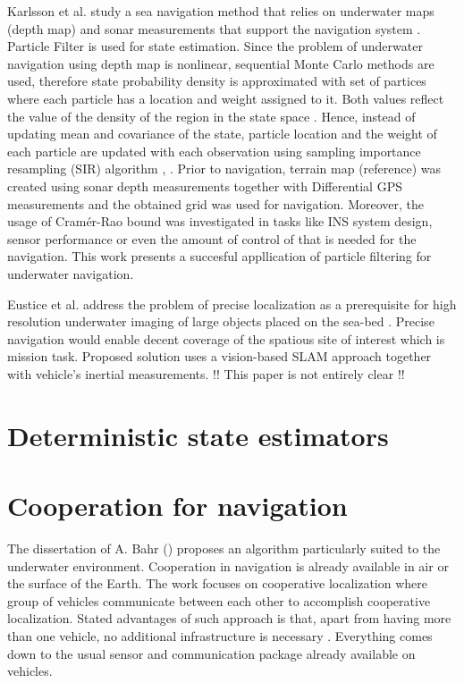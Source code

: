 Karlsson et al. study a sea navigation method that relies on underwater maps (depth map) and sonar measurements that support the navigation system \cite{karlsson02}. Particle Filter is used for state estimation. Since the problem of underwater navigation using depth map is nonlinear, sequential Monte Carlo methods are used, therefore state probability density is approximated with set of partices where each particle has a location and weight assigned to it. Both values reflect the value of the density of the region in the state space \cite{karlsson02}. Hence, instead of updating mean and covariance of the state, particle location and the weight of each particle are updated with each observation using sampling importance resampling (SIR) algorithm \cite{karlsson02}, \cite{gordon93}. Prior to navigation, terrain map (reference) was created using sonar depth measurements together with Differential GPS measurements and the obtained grid was used for navigation. Moreover, the usage of Cram\'{e}r-Rao bound was investigated in tasks like INS system design, sensor performance or even the amount of control of that is needed for the navigation. This work presents a succesful appllication of particle filtering for underwater navigation.





Eustice et al. address the problem of precise localization as a prerequisite for high resolution underwater imaging of large objects placed on the sea-bed \cite{eustice05}. Precise navigation would enable decent coverage of the spatious site of interest which is mission task. Proposed solution uses a vision-based SLAM approach together with vehicle's inertial measurements. !! This paper is not entirely clear !!

\section{Deterministic state estimators}
 
\section{Cooperation for navigation}
The dissertation of A. Bahr (\cite{bahr08}) proposes an algorithm particularly suited to the underwater environment. Cooperation in navigation is already available in air or the surface of the Earth. The work focuses on cooperative localization where group of vehicles communicate between each other to accomplish cooperative localization. Stated advantages of such approach is that, apart from having more than one vehicle, no additional infrastructure is necessary \cite{bahr08}. Everything comes down to the usual sensor and communication package already available on vehicles\cite{bahr08}. 

  
